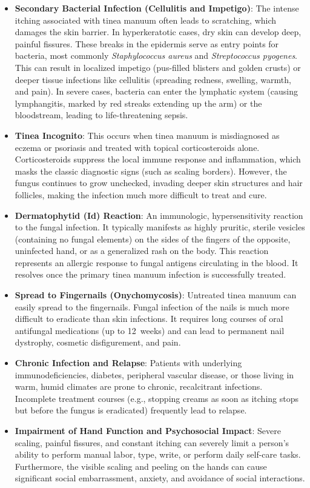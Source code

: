 \begin{itemize}
    \item \textbf{Secondary Bacterial Infection (Cellulitis and Impetigo)}: The intense itching associated with tinea manuum often leads to scratching, which damages the skin barrier. In hyperkeratotic cases, dry skin can develop deep, painful fissures. These breaks in the epidermis serve as entry points for bacteria, most commonly \textit{Staphylococcus aureus} and \textit{Streptococcus pyogenes}. This can result in localized impetigo (pus-filled blisters and golden crusts) or deeper tissue infections like cellulitis (spreading redness, swelling, warmth, and pain). In severe cases, bacteria can enter the lymphatic system (causing lymphangitis, marked by red streaks extending up the arm) or the bloodstream, leading to life-threatening sepsis.
    \item \textbf{Tinea Incognito}: This occurs when tinea manuum is misdiagnosed as eczema or psoriasis and treated with topical corticosteroids alone. Corticosteroids suppress the local immune response and inflammation, which masks the classic diagnostic signs (such as scaling borders). However, the fungus continues to grow unchecked, invading deeper skin structures and hair follicles, making the infection much more difficult to treat and cure.
    \item \textbf{Dermatophytid (Id) Reaction}: An immunologic, hypersensitivity reaction to the fungal infection. It typically manifests as highly pruritic, sterile vesicles (containing no fungal elements) on the sides of the fingers of the opposite, uninfected hand, or as a generalized rash on the body. This reaction represents an allergic response to fungal antigens circulating in the blood. It resolves once the primary tinea manuum infection is successfully treated.
    \item \textbf{Spread to Fingernails (Onychomycosis)}: Untreated tinea manuum can easily spread to the fingernails. Fungal infection of the nails is much more difficult to eradicate than skin infections. It requires long courses of oral antifungal medications (up to 12~weeks) and can lead to permanent nail dystrophy, cosmetic disfigurement, and pain.
    \item \textbf{Chronic Infection and Relapse}: Patients with underlying immunodeficiencies, diabetes, peripheral vascular disease, or those living in warm, humid climates are prone to chronic, recalcitrant infections. Incomplete treatment courses (e.g., stopping creams as soon as itching stops but before the fungus is eradicated) frequently lead to relapse.
    \item \textbf{Impairment of Hand Function and Psychosocial Impact}: Severe scaling, painful fissures, and constant itching can severely limit a person's ability to perform manual labor, type, write, or perform daily self-care tasks. Furthermore, the visible scaling and peeling on the hands can cause significant social embarrassment, anxiety, and avoidance of social interactions.
\end{itemize}

